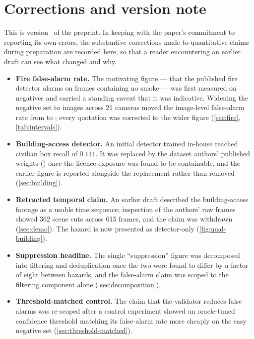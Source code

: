 \section{Corrections and version note}
\label{sec:changelog}

This is version~\DocVersion{} of the preprint. In keeping with the paper's
commitment to reporting its own errors, the substantive corrections made to
quantitative claims during preparation are recorded here, so that a reader
encountering an earlier draft can see what changed and why.

\begin{itemize}
  \item \textbf{Fire false-alarm rate.} The motivating figure — that the
        published fire detector alarms on frames containing no smoke — was
        first measured on \FireNarrowNegatives{} negatives and carried a
        standing caveat that it was indicative. Widening the negative set to
        \FireNegatives{} images across 21 cameras moved the image-level
        false-alarm rate from \FireNarrowFAR{} to \FireImageFAR{}; every
        quotation was corrected to the wider figure
        (\cref{sec:fire}, \cref{tab:intervals}).
  \item \textbf{Building-access detector.} An initial detector trained in-house
        reached civilian box recall of $0.141$. It was replaced by the
        dataset authors' published weights (\BuildingBoxRecall) once the
        licence exposure was found to be containable, and the earlier figure
        is reported alongside the replacement rather than removed
        (\cref{sec:building}).
  \item \textbf{Retracted temporal claim.} An earlier draft described the
        building-access footage as a usable time sequence; inspection of the
        authors' raw frames showed 362 scene cuts across 615 frames, and the
        claim was withdrawn (\cref{sec:demo}). The hazard is now presented as
        detector-only (\cref{fig:qual-building}).
  \item \textbf{Suppression headline.} The single ``suppression'' figure was
        decomposed into filtering and deduplication once the two were found to
        differ by a factor of eight between hazards, and the false-alarm claim
        was scoped to the filtering component alone
        (\cref{sec:decomposition}).
  \item \textbf{Threshold-matched control.} The claim that the validator
        reduces false alarms was re-scoped after a control experiment showed
        an oracle-tuned confidence threshold matching its false-alarm rate
        more cheaply on the easy negative set (\cref{sec:threshold-matched}).
\end{itemize}
